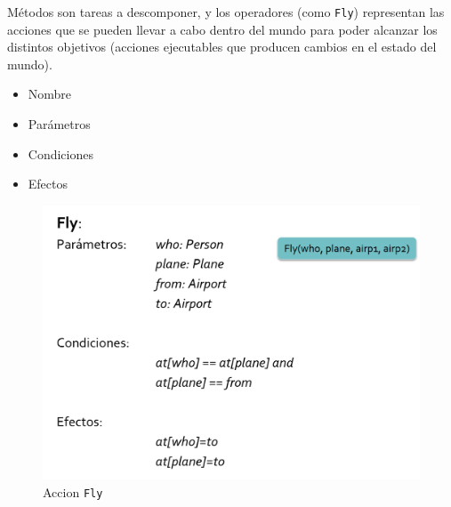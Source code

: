 \begin{paracol}{2}
   \colfill
   Métodos son tareas a descomponer, y los operadores (como \lstinline|Fly|) representan las acciones que se pueden llevar a cabo dentro del
   mundo para poder alcanzar los distintos objetivos (acciones
   ejecutables que producen cambios en el estado del mundo).
   \begin{itemize}
      \item Nombre
      \item Parámetros
      \item Condiciones
      \item Efectos
   \end{itemize}
   \colfill
   
   \switchcolumn

   \begin{figure}[htbp]
      \centering
      \includegraphics[width=\columnwidth]{images/02/accionFly.png}
      \caption{Accion \lstinline|Fly|}
      \label{fig:02/accionFly}
   \end{figure}
\end{paracol}